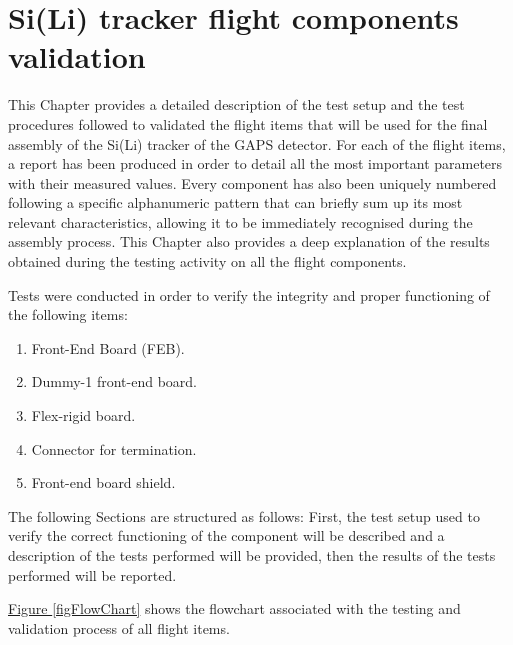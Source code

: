 \chapter[Si(Li) tracker flight components validation]{Si(Li) tracker flight components \\validation} \label{ch2}

This Chapter provides a detailed description of the test setup and the test procedures followed to validated the flight items that will be used for the final assembly of the Si(Li) tracker of the GAPS detector. For each of the flight items, a report has been produced in order to detail all the most important parameters with their measured values. Every component has also been uniquely numbered following a specific alphanumeric pattern that can briefly sum up its most relevant characteristics, allowing it to be immediately recognised during the assembly process. This Chapter also provides a deep explanation of the results obtained during the testing activity on all the flight components.

\par
Tests were conducted in order to verify the integrity and proper functioning of the following items:

\begin{enumerate}
    \itemsep0em 
    \item Front-End Board (FEB).
    \item Dummy-1 front-end board.
    \item Flex-rigid board.
    \item Connector for termination.
    \item Front-end board shield.
\end{enumerate}

\par
The following Sections are structured as follows: First, the test setup used to verify the correct functioning of the component will be described and a description of the tests performed will be provided, then the results of the tests performed will be reported. 


\hyperref[figFlowChart]{Figure \ref{figFlowChart}} shows the flowchart associated with the testing and validation process of all flight items.

